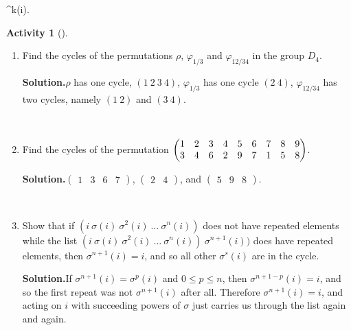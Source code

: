 \documentclass[10pt,]{book}
\theoremstyle{plain}
\theoremstyle{definition}
\newtheorem{activity}[project]{Activity}
\numberwithin{equation}{chapter}
\newcommand{\amp}{&}
\begin{document}
\sigma^k(i)\).%
\begin{activity}[]\label{firstrepeat}
~\par
\begin{enumerate}[label=(\alph*)]
 \item Find the cycles of the permutations \(\rho\), \(\varphi_{1/3}\) and \(\varphi_{12/34}\) in the group \(D_4\).%
\par\medskip\noindent%
\textbf{Solution.}\quad \(\rho\) has one cycle, \((1\ 2\ 3\ 4)\), \(\varphi_{1/3}\) has one cycle \((2\ 4)\), \(\varphi_{12/34}\) has two cycles, namely \((1\ 2)\) and \((3\ 4)\).%

~\par
\item Find the cycles of the permutation \(\begin{pmatrix}1\amp 2\amp 3\amp 4\amp 5\amp 6\amp 7\amp 8\amp 9\cr
3\amp 4\amp 6\amp 2\amp 9\amp 7\amp 1\amp 5\amp 8
\end{pmatrix}\).%
\par\medskip\noindent%
\textbf{Solution.}\quad \(\begin{pmatrix}1\amp 3\amp 6\amp 7
\end{pmatrix}\), \(\begin{pmatrix}2\amp 4
\end{pmatrix}\), and \(\begin{pmatrix}5\amp 9\amp 8
\end{pmatrix}\).%

~\par
\item Show that if \((i\
\sigma(i)\
\sigma^2(i)
\ \ldots\
\sigma^n(i))\) does not have repeated elements while the list \((i\ \sigma(i)\
\sigma^2(i)\ \ldots\ \sigma^n(i))\ \sigma^{n+1}(i))\) does have repeated elements, then \(\sigma^{n+1}(i)=i\), and so all other \(\sigma^s(i)\) are in the cycle.%
\par\medskip\noindent%
\textbf{Solution.}\quad If \(\sigma^{n+1}(i) = \sigma^p(i)\) and \(0\le p\le n\), then \(\sigma^{n+1-p}(i)
=i\), and so the first repeat was not \(\sigma^{n+1}(i)\) after all. Therefore \(\sigma^{n+1}(i)=i\), and acting on \(i\) with succeeding powers of \(\sigma\) just carries us through the list again and again.%

\end{enumerate}
\end{activity}
\end{document}
